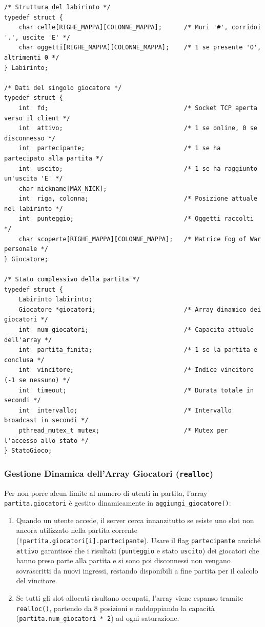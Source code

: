 \documentclass[11pt,a4paper]{article}
\begin{document}
\begin{lstlisting}[style=cstyle]
/* Struttura del labirinto */
typedef struct {
    char celle[RIGHE_MAPPA][COLONNE_MAPPA];      /* Muri '#', corridoi '.', uscite 'E' */
    char oggetti[RIGHE_MAPPA][COLONNE_MAPPA];    /* 1 se presente 'O', altrimenti 0 */
} Labirinto;

/* Dati del singolo giocatore */
typedef struct {
    int  fd;                                     /* Socket TCP aperta verso il client */
    int  attivo;                                 /* 1 se online, 0 se disconnesso */
    int  partecipante;                           /* 1 se ha partecipato alla partita */
    int  uscito;                                 /* 1 se ha raggiunto un'uscita 'E' */
    char nickname[MAX_NICK];
    int  riga, colonna;                          /* Posizione attuale nel labirinto */
    int  punteggio;                              /* Oggetti raccolti */
    char scoperte[RIGHE_MAPPA][COLONNE_MAPPA];   /* Matrice Fog of War personale */
} Giocatore;

/* Stato complessivo della partita */
typedef struct {
    Labirinto labirinto;
    Giocatore *giocatori;                        /* Array dinamico dei giocatori */
    int  num_giocatori;                          /* Capacita attuale dell'array */
    int  partita_finita;                         /* 1 se la partita e conclusa */
    int  vincitore;                              /* Indice vincitore (-1 se nessuno) */
    int  timeout;                                /* Durata totale in secondi */
    int  intervallo;                             /* Intervallo broadcast in secondi */
    pthread_mutex_t mutex;                       /* Mutex per l'accesso allo stato */
} StatoGioco;
\end{lstlisting}

\subsubsection{Gestione Dinamica dell'Array Giocatori (\texttt{realloc})}
Per non porre alcun limite al numero di utenti in partita, l'array \texttt{partita.giocatori} è gestito dinamicamente in \texttt{aggiungi\_giocatore()}:
\begin{enumerate}
    \item Quando un utente accede, il server cerca innanzitutto se esiste uno slot non ancora utilizzato nella partita corrente (\texttt{!partita.giocatori[i].partecipante}). Usare il flag \texttt{partecipante} anziché \texttt{attivo} garantisce che i risultati (\texttt{punteggio} e stato \texttt{uscito}) dei giocatori che hanno preso parte alla partita e si sono poi disconnessi non vengano sovrascritti da nuovi ingressi, restando disponibili a fine partita per il calcolo del vincitore.
    \item Se tutti gli slot allocati risultano occupati, l'array viene espanso tramite \texttt{realloc()}, partendo da 8 posizioni e raddoppiando la capacità (\texttt{partita.num\_giocatori * 2}) ad ogni saturazione.
\end{enumerate}
\end{document}
